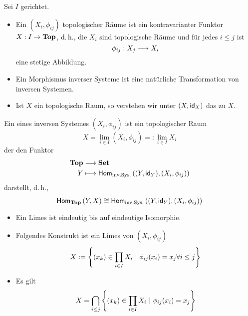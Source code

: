 \documentclass{book}
\begin{document}
Sei $I$ gerichtet.
\begin{itemize}
	\item Ein  $(X_i, \phi_{ij})$ topologischer Räume ist ein kontravarianter Funktor $X : I \overset{}{\rightarrow} \textbf{Top}$, d.\,h., die $X_i$ sind topologische Räume und für jedes $i\leq j$ ist
	\[\phi_{ij} :X_j \overset{}{\longrightarrow}X_i \]
	eine stetige Abbildung.
	\item Ein Morphismus inverser Systeme ist eine natürliche Transformation von inversen Systemen.
	\item Ist $X$ ein topologische Raum, so verstehen wir unter $(X, \textsf{id}_{X})$ das  zu $X$.
\end{itemize}

Ein  eines inversen Systemes $(X_i, \phi_{ij})$ ist ein topologischer Raum
\[ X = \lim\limits_{i \in I}(X_i, \phi_{ij}) =: \lim\limits_{i\in I}X_i \]
der den Funktor
\begin{align*}
\textbf{Top} &\overset{}{\longrightarrow} \textbf{Set}\\
Y & \longmapsto \textsf{Hom}_{\text{inv.Sys.}}\left((Y,\textsf{id}_{Y}), (X_i, \phi_{ij})\right)
\end{align*}
darstellt, d.\,h.,
\[ \textsf{Hom}_{\textbf{Top}}\left(Y, X\right)  \overset{}{\cong} \textsf{Hom}_{\text{inv.Sys.}}\left((Y,\textsf{id}_{Y}), (X_i, \phi_{ij})\right) \]

\Bem{}
\begin{itemize}
	\item Ein Limes ist eindeutig bis auf eindeutige Isomorphie.
	\item Folgendes Konstrukt ist ein Limes von $(X_i, \phi_{ij})$
	\[ X:= \set{(x_k) \in \prod_{i\in I}X_i }{ \phi_{ij}(x_i) = x_j \forall i \leq j } \]
	\item Es gilt
	\[ X= \bigcap_{i\leq j} \set{(x_k) \in \prod_{i\in I}X_i }{ \phi_{ij}(x_i) = x_j} \]
\end{itemize}
\end{document}
